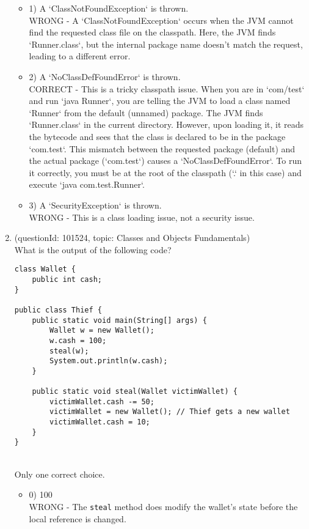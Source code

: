 \documentclass[12pt]{article}
\begin{document}
\begin{enumerate}[label=(\arabic*)]
\begin{itemize}
\item 1) A `ClassNotFoundException` is thrown.
 \\ 
WRONG - A `ClassNotFoundException` occurs when the JVM cannot find the requested class file on the classpath. Here, the JVM finds `Runner.class`, but the internal package name doesn't match the request, leading to a different error.

\item 2) A `NoClassDefFoundError` is thrown.
 \\ 
CORRECT - This is a tricky classpath issue. When you are in `com/test` and run `java Runner`, you are telling the JVM to load a class named `Runner` from the default (unnamed) package. The JVM finds `Runner.class` in the current directory. However, upon loading it, it reads the bytecode and sees that the class is declared to be in the package `com.test`. This mismatch between the requested package (default) and the actual package (`com.test`) causes a `NoClassDefFoundError`. To run it correctly, you must be at the root of the classpath (`.` in this case) and execute `java com.test.Runner`.

\item 3) A `SecurityException` is thrown.
 \\ 
WRONG - This is a class loading issue, not a security issue.

\end{itemize}
\item (questionId: 101524, topic: Classes and Objects Fundamentals) \\ 
What is the output of the following code?\n\begin{verbatim}
class Wallet {
    public int cash;
}

public class Thief {
    public static void main(String[] args) {
        Wallet w = new Wallet();
        w.cash = 100;
        steal(w);
        System.out.println(w.cash);
    }

    public static void steal(Wallet victimWallet) {
        victimWallet.cash -= 50;
        victimWallet = new Wallet(); // Thief gets a new wallet
        victimWallet.cash = 10;
    }
}
\end{verbatim}
\\ \noindent Only one correct choice. 
\begin{itemize}
\item 0) 100
 \\ 
WRONG - The \verb|steal| method does modify the wallet's state before the local reference is changed.


\end{itemize}
\end{enumerate}
\end{document}
